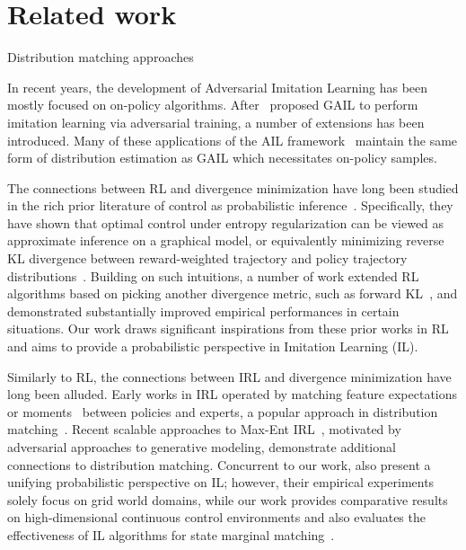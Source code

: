 \section{Related work}
Distribution matching approaches 

In recent years, the development of Adversarial Imitation Learning has been mostly focused on on-policy algorithms. 
After~\citet{ho2016generative} proposed GAIL to perform imitation learning via adversarial training, a number of extensions has been introduced. 
Many of these applications of the AIL framework~\citep{li2017infogail,hausman2017multi,sun2019adversarial} maintain the same form of distribution estimation as GAIL which necessitates on-policy samples. 


The connections between RL and divergence minimization have long been studied in the rich prior literature of control as probabilistic inference~\citep{todorov2007linearly,toussaint2009robot,peters2010relative,kappen2012optimal}. 
Specifically, they have shown that optimal control under entropy regularization can be viewed as approximate inference on a graphical model, or equivalently minimizing reverse KL divergence between reward-weighted trajectory and policy trajectory distributions~\citep{kappen2012optimal,levine2018reinforcement}.
Building on such intuitions, a number of work extended RL algorithms based on picking another divergence metric, such as forward KL~\citep{peters2007reinforcement,norouzi2016reward}, and demonstrated substantially improved empirical performances in certain situations. 
Our work draws significant inspirations from these prior works in RL and aims to provide a probabilistic perspective in Imitation Learning (IL).


Similarly to RL, the connections between IRL and divergence minimization have long been alluded. 
Early works in IRL operated by matching feature expectations or moments~\citep{abbeel2004apprenticeship} between policies and experts, a popular approach in distribution matching~\citep{dziugaite2015training,li2015generative}.
Recent scalable approaches to Max-Ent IRL~\citep{ho2016generative}, motivated by adversarial approaches to generative modeling, demonstrate additional connections to distribution matching. 
Concurrent to our work, \citet{ke2019imitation} also present a unifying probabilistic perspective on IL; 
however, their empirical experiments solely focus on grid world domains, while our work provides comparative results on high-dimensional continuous control environments and also evaluates the effectiveness of IL algorithms for state marginal matching~\citep{lee2019efficient}.

